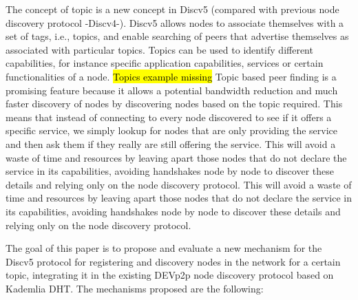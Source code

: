 The concept of topic is a new concept in Discv5 (compared with previous node discovery protocol -Discv4-).
Discv5 allows nodes to associate themselves with a set of tags, i.e., topics, and enable searching of peers that advertise themselves as associated with particular topics.  
Topics can be used to identify different  capabilities, for instance specific application capabilities,  services or certain functionalities of a node. 
\hl{Topics example missing}
Topic based peer finding is a promising feature because it allows a potential bandwidth reduction and much faster discovery of nodes
by  discovering nodes based on the topic required.
This means that instead of connecting to every node discovered to see if it offers a specific service,  we simply lookup for nodes that are only providing the service and then ask them if they really are still offering the service.
This will avoid a waste of time and resources by leaving apart those nodes that do not declare the service in its capabilities,  avoiding handshakes node by node to discover these details and relying only on the node discovery protocol. 
This will avoid a waste of time and resources by leaving apart those nodes that do not declare the service in its capabilities, avoiding handshakes node by node to discover these details and relying only on the node discovery protocol.



The goal of this paper is to propose and evaluate a new mechanism for the Discv5 protocol for registering and discovery nodes in the network for a certain topic,  integrating it in the existing DEVp2p node discovery protocol based on Kademlia DHT.  
The mechanisms proposed are the following:

